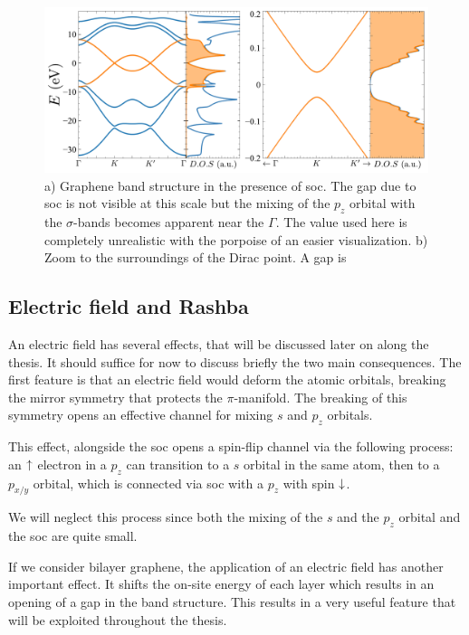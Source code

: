 \begin{figure}[h!]
\centering
\includegraphics{graphene/figures/banddos_SOC.pdf}
\vspace{-5pt}
\caption{a) Graphene band structure in the presence of \ac{soc}. The gap due to \ac{soc} is not visible at this scale but the mixing of the $p_z$ orbital with the $\sigma$-bands becomes apparent near the $\Gamma$. The value used here is completely unrealistic with the porpoise of an easier visualization. b) Zoom to the surroundings of the Dirac point. A gap is }
\label{fig:SOC}
\end{figure}
\FloatBarrier

\subsection{Electric field and Rashba}
An electric field has several effects, that will be discussed later on along the thesis. It should suffice for now to discuss briefly the two main consequences.
The first feature is that an electric field would deform the atomic orbitals, breaking the mirror symmetry that protects the $\pi$-manifold. The breaking of this symmetry opens an effective channel for mixing $s$ and $p_z$ orbitals.

This effect, alongside the \ac{soc} opens a spin-flip channel via the following process: an $\uparrow$ electron in a $p_z$ can transition to a $s$ orbital in the same atom, then to a $p_{x/y}$ orbital, which is connected via \ac{soc} with a $p_z$ with spin $\downarrow$.

We will neglect this process since both the mixing of the $s$ and the $p_z$ orbital\cite{Min2006} and the \ac{soc}\cite{Kane2005, Yao2007, Boettger2007,Gmitra2009} are quite small.

If we consider bilayer graphene, the application of an electric field has another important effect. It shifts the on-site energy of each layer which results in an opening of a gap in the band structure. This results in a very useful feature that will be exploited throughout the thesis.


